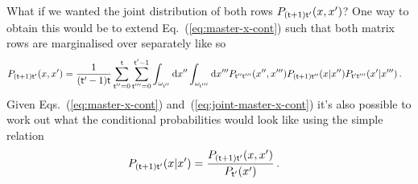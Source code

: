 \documentclass{book}
\begin{document}
What if we wanted the joint distribution of both rows $P_{({\sf t}+1){\sf t}'}(x,x')$? One way to obtain this would be to extend Eq.~(\ref{eq:master-x-cont}) such that both matrix rows are marginalised over separately like so
\begin{align}
&P_{({\sf t}+1){\sf t}'}(x,x') = \frac{1}{({\sf t}'-1){\sf t}}\sum_{{\sf t}''=0}^{{\sf t}}\sum_{{\sf t}'''=0}^{{\sf t}'-1}\int_{\omega_{{\sf t}''}}{\rm d}x''\int_{\omega_{{\sf t}'''}}{\rm d}x''' P_{{\sf t}''{\sf t}'''}(x'', x''') P_{({\sf t}+1){\sf t}''}(x\vert x'')P_{{\sf t}'{\sf t}'''}(x'\vert x''') \label{eq:joint-master-x-cont} \,.
\end{align}
Given Eqs.~(\ref{eq:master-x-cont}) and~(\ref{eq:joint-master-x-cont}) it's also possible to work out what the conditional probabilities would look like using the simple relation
\begin{align}
P_{({\sf t}+1){\sf t}'}(x\vert x') &= \frac{P_{({\sf t}+1){\sf t}'}(x,x')}{P_{{\sf t}'}(x')} \label{eq:cond-master-x-cont} \,.
\end{align}
\end{document}
